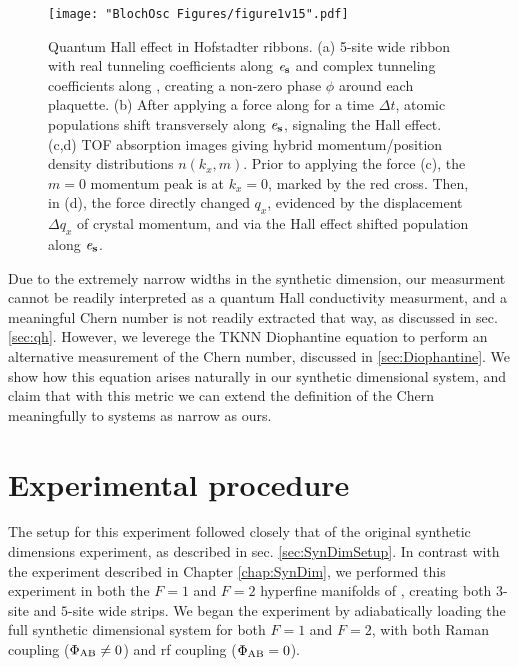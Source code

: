 \begin{figure*}
\texttt{[image: "BlochOsc Figures/figure1v15".pdf]}
\caption[Quantum Hall effect in Hofstadter ribbons]{Quantum Hall effect in Hofstadter ribbons. (a) 5-site wide ribbon with real tunneling coefficients along $\bf{\mathit{e}_s}$   and complex tunneling coefficients along \ex,  creating a non-zero phase  $\phi$ around each plaquette. (b) After applying a force along \ex  for a time $\Delta t$, atomic populations shift transversely along $\bf{\mathit{e}_s}$, signaling the Hall effect. (c,d)  TOF absorption images giving hybrid momentum/position density distributions $n(k_x,m)$. Prior to applying the force (c), the $m=0$ momentum peak is at $k_x=0$, marked by the red cross. Then, in (d), the force directly changed $q_x$, evidenced by the displacement $\Delta q_x$ of crystal momentum, and via the Hall effect shifted population along $\bf{\mathit{e}_s}$. }
\label{fig:laughlinPump}
\end{figure*}

Due to the extremely narrow widths in the synthetic dimension, our measurment cannot be readily interpreted as a quantum Hall conductivity measurment, and a meaningful Chern number is not readily extracted that way, as discussed in sec. \ref{sec:qh}. However, we leverege the TKNN Diophantine equation \cite{Thouless1982} to perform an alternative measurement of the Chern number, discussed in \ref{sec:Diophantine}. We show how this equation arises naturally in our synthetic dimensional system, and claim that with this metric we can extend the definition of the Chern meaningfully to systems as narrow as ours.  

\section{Experimental procedure}

The setup for this experiment followed closely that of the original synthetic dimensions experiment, as described in sec. \ref{sec:SynDimSetup}. In contrast with the experiment described in Chapter \ref{chap:SynDim}, we performed this experiment in both the $F=1$ and $F=2$ hyperfine manifolds of \Rb{}, creating both $3$-site and $5$-site wide strips. We began the experiment by adiabatically loading the full synthetic dimensional system for both $F=1$ and $F=2$, with both Raman coupling ($\Phi_{\rm AB}\neq0$) and rf coupling ($\Phi_{\rm AB}=0$). 

